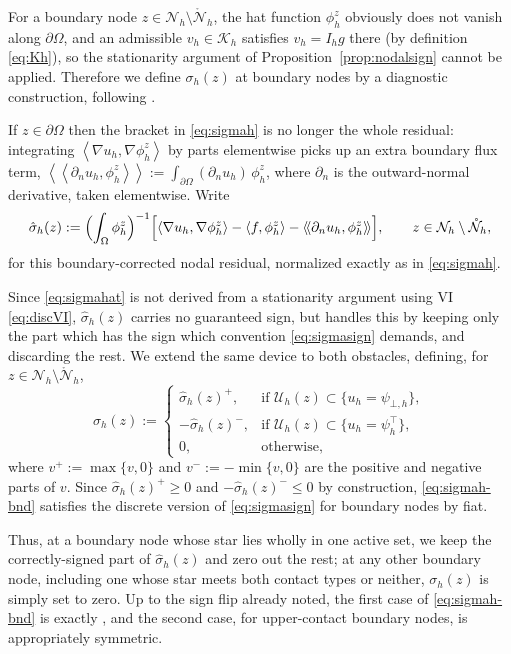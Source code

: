 \documentclass[12pt]{amsart}
\theoremstyle{definition}
\newcommand{\Om}{\Omega}
\newcommand{\dOm}{\partial\Omega}
\newcommand{\psiloh}{\psi_{\bot,h}}
\newcommand{\psiuph}{\psi^\top_h}
\newcommand{\Nh}{\mathcal{N}_h}
\newcommand{\Nhr}{\mathring{\mathcal{N}}_h}
\newcommand{\Ih}{I_h}
\newcommand{\Uh}{\mathcal{U}_h}
\newcommand{\Kh}{\mathcal{K}_h}
\begin{document}
For a boundary node $z \in \Nh \setminus \Nhr$, the hat function $\phi_h^z$ obviously does not vanish along $\dOm$, and an admissible $v_h\in\Kh$ satisfies $v_h = \Ih g$ there (by definition \eqref{eq:Kh}), so the stationarity argument of Proposition~\ref{prop:nodalsign} cannot be applied.  Therefore we define $\sigma_h(z)$ at boundary nodes by a diagnostic construction, following \cite[\S 2.1]{NSV03}.

If $z\in\dOm$ then the bracket in \eqref{eq:sigmah} is no longer the whole residual: integrating $\left<\nabla u_h,\nabla\phi_h^z\right>$ by parts elementwise picks up an extra boundary flux term, $\left<\!\left<\partial_n u_h,\phi_h^z\right>\!\right> := \int_{\dOm} (\partial_n u_h)\,\phi_h^z$, where $\partial_n$ is the outward-normal derivative, taken elementwise. Write
\begin{equation}
\label{eq:sigmahat}
  \hat\sigma_h(z) := \Bigl(\int_\Om \phi_h^z\Bigr)^{-1}
  \Bigl[\left<\nabla u_h,\nabla\phi_h^z\right> - \left< f,\phi_h^z\right> - \left<\!\left<\partial_n u_h,\phi_h^z\right>\!\right>\Bigr],
  \qquad z \in \Nh\setminus\Nhr,
\end{equation}
for this boundary-corrected nodal residual, normalized exactly as in \eqref{eq:sigmah}.

Since \eqref{eq:sigmahat} is not derived from a stationarity argument using VI \eqref{eq:discVI}, $\hat\sigma_h(z)$ carries no guaranteed sign, but \cite{NSV03} handles this by keeping only the part which has the sign which convention \eqref{eq:sigmasign} demands, and discarding the rest.  We extend the same device to both obstacles, defining, for $z \in \Nh\setminus\Nhr$,
\begin{equation}
\label{eq:sigmah-bnd}
  \sigma_h(z) := \begin{cases}
    \hat\sigma_h(z)^+, & \text{if } \Uh(z) \subset \{u_h = \psiloh\}, \\
    -\hat\sigma_h(z)^-, & \text{if } \Uh(z) \subset \{u_h = \psiuph\}, \\
    0, & \text{otherwise},
  \end{cases}
\end{equation}
where $v^+ := \max\{v,0\}$ and $v^- := -\min\{v,0\}$ are the positive and negative parts of $v$.  Since $\hat\sigma_h(z)^+ \ge 0$ and $-\hat\sigma_h(z)^- \le 0$ by construction, \eqref{eq:sigmah-bnd} satisfies the discrete version of \eqref{eq:sigmasign} for boundary nodes by fiat.

Thus, at a boundary node whose star lies wholly in one active set, we keep the correctly-signed part of $\hat\sigma_h(z)$ and zero out the rest; at any other boundary node, including one whose star meets both contact types or neither, $\sigma_h(z)$ is simply set to zero.  Up to the sign flip already noted, the first case of \eqref{eq:sigmah-bnd} is exactly \cite[formula (2.2)]{NSV03}, and the second case, for upper-contact boundary nodes, is appropriately symmetric.
\end{document}
